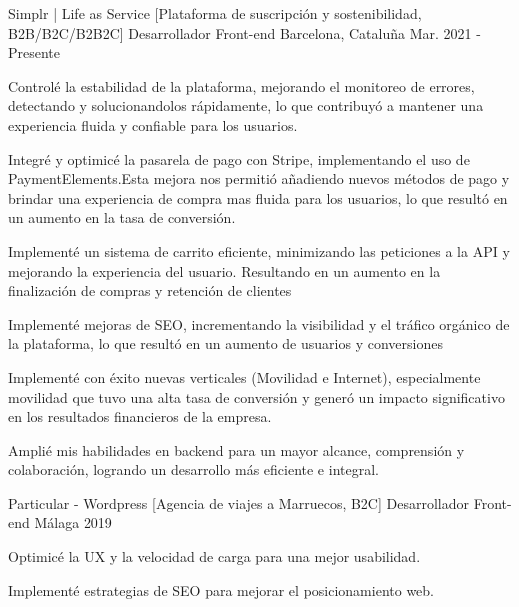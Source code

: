 
\begin{cventries}
    \cventry
    {Simplr | Life as Service [Plataforma de suscripción y sostenibilidad, B2B/B2C/B2B2C]}
    {Desarrollador Front-end}
    {Barcelona, Cataluña}
    {Mar. 2021 - Presente}
    {
    \begin{cvitems}
        \item{Controlé la estabilidad de la plataforma, mejorando el monitoreo de errores, detectando y solucionandolos rápidamente, lo que contribuyó a mantener una experiencia fluida y confiable para los usuarios.}
        \item{Integré y optimicé la pasarela de pago con Stripe, implementando el uso de PaymentElements.Esta mejora nos permitió añadiendo nuevos métodos de pago y brindar una experiencia de compra mas fluida para los usuarios, lo que resultó en un aumento en la tasa de conversión.}
        \item{Implementé un sistema de carrito eficiente, minimizando las peticiones a la API y mejorando la experiencia del usuario. Resultando en un aumento en la finalización de compras y retención de clientes}
        \item{Implementé mejoras de SEO, incrementando la visibilidad y el tráfico orgánico de la plataforma, lo que resultó en un aumento de usuarios y conversiones}
        \item{Implementé con éxito nuevas verticales (Movilidad e Internet), especialmente movilidad que tuvo una alta tasa de conversión y generó un impacto significativo en los resultados financieros de la empresa.}
        \item{Amplié mis habilidades en backend para un mayor alcance, comprensión y colaboración, logrando un desarrollo más eficiente e integral. }
    \end{cvitems}
    }

    \cventry
    {Particular - Wordpress [Agencia de viajes a Marruecos, B2C]}
    {Desarrollador Front-end}
    {Málaga}
    {2019}
    {
    \begin{cvitems}
        \item{Optimicé la UX y la velocidad de carga para una mejor usabilidad.}
        \item{Implementé estrategias de SEO para mejorar el posicionamiento web.}
    \end{cvitems}
    }


\end{cventries}
